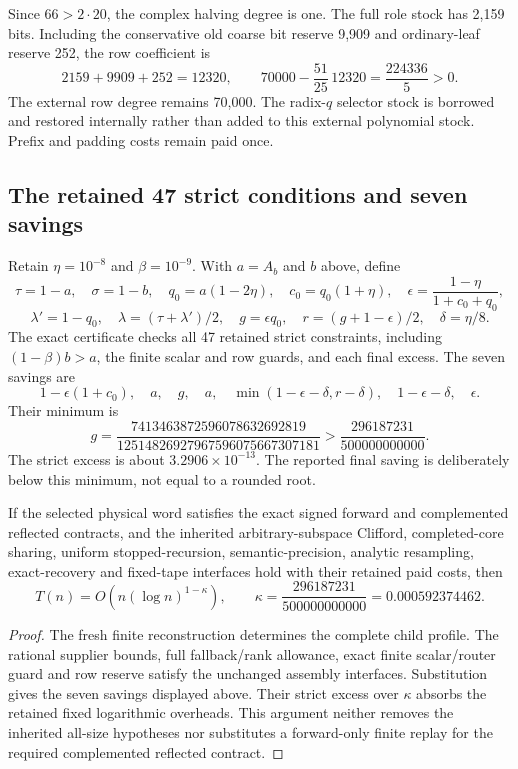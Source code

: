 Since $66>2\cdot20$, the complex halving degree is one. The full role
stock has 2,159 bits. Including the conservative old coarse bit reserve
9,909 and ordinary-leaf reserve 252, the row coefficient is
\[
 2159+9909+252=12320,\qquad
 70000-\frac{51}{25}\,12320=\frac{224336}{5}>0.
\]
The external row degree remains 70,000. The radix-$q$ selector stock
is borrowed and restored internally rather than added to this external
polynomial stock. Prefix and padding costs remain paid once.

\subsection{The retained 47 strict conditions and seven savings}
Retain $\eta=10^{-8}$ and $\beta=10^{-9}$. With $a=A_b$ and $b$ above,
define
\[
 \tau=1-a,\quad\sigma=1-b,\quad q_0=a(1-2\eta),\quad
 c_0=q_0(1+\eta),\quad
 \epsilon=\frac{1-\eta}{1+c_0+q_0},
\]
\[
 \lambda'=1-q_0,\quad\lambda=(\tau+\lambda')/2,\quad
 g=\epsilon q_0,\quad r=(g+1-\epsilon)/2,\quad\delta=\eta/8.
\]
The exact certificate checks all 47 retained strict constraints, including
$(1-\beta)b>a$, the finite scalar and row guards, and each final excess.
The seven savings are
\[
 1-\epsilon(1+c_0),\quad a,\quad g,\quad a,\quad
 \min(1-\epsilon-\delta,r-\delta),\quad
 1-\epsilon-\delta,\quad\epsilon.
\]
Their minimum is
\[
 g=\frac{7413463872596078632692819}
          {12514826927967596075667307181}
   >\frac{296187231}{500000000000}.
\]
The strict excess is about $3.2906\times10^{-13}$. The reported final
saving is deliberately below this minimum, not equal to a rounded root.

\begin{proposition}
If the selected physical word satisfies the exact signed forward and
complemented reflected contracts, and the inherited arbitrary-subspace
Clifford, completed-core sharing, uniform stopped-recursion,
semantic-precision, analytic resampling, exact-recovery and fixed-tape
interfaces hold with their retained paid costs, then
\[
 T(n)=O\!\left(n(\log n)^{1-\kappa}\right),\qquad
 \kappa=\frac{296187231}{500000000000}=0.000592374462.
\]
\end{proposition}
\begin{proof}
The fresh finite reconstruction determines the complete child profile.
The rational supplier bounds, full fallback/rank allowance, exact finite
scalar/router guard and row reserve satisfy the unchanged assembly
interfaces. Substitution gives the seven savings displayed above.
Their strict excess over $\kappa$ absorbs the retained fixed logarithmic
overheads. This argument neither removes the inherited all-size
hypotheses nor substitutes a forward-only finite replay for the required
complemented reflected contract.
\end{proof}

